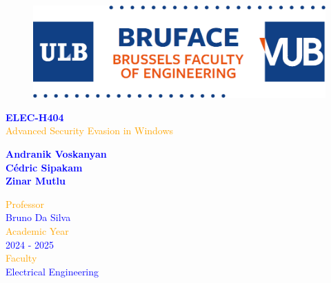 \begin{titlepage}
	\begin{center}
            \begin{figure}
                \centering
                \includegraphics[scale=0.3]{Images/logo.png}
            \end{figure}
		\vspace*{\fill}
            \normalsize
            {\selectfont
            \textcolor{blue}{\textbf{ELEC-H404}}}\\
            \vspace{0.2cm}
		\Huge
            {\selectfont
            \textcolor{orange}{Advanced Security Evasion in Windows}}\\
        \end{center}
	\begin{center}	
		\vspace{0.5cm}
            \Large
            {\selectfont
		\textcolor{blue}{\textbf{Andranik Voskanyan\\
								Cédric Sipakam\\
								Zinar Mutlu}}}\\
	\end{center}
        \vspace*{\fill}
        \begin{FlushRight}
            {\selectfont
            \textcolor{orange}{Professor}}\\
            {\selectfont
            \textcolor{blue}{Bruno Da Silva}}\\
            \vspace{0.6cm}
            {\selectfont
            \textcolor{orange}{Academic Year}}\\
            {\selectfont
            \textcolor{blue}{2024 - 2025}}\\
            \vspace{0.6cm}
            {\selectfont
            \textcolor{orange}{Faculty}}\\
            {\selectfont
            \textcolor{blue}{Electrical Engineering}}
        \end{FlushRight}



\end{titlepage}